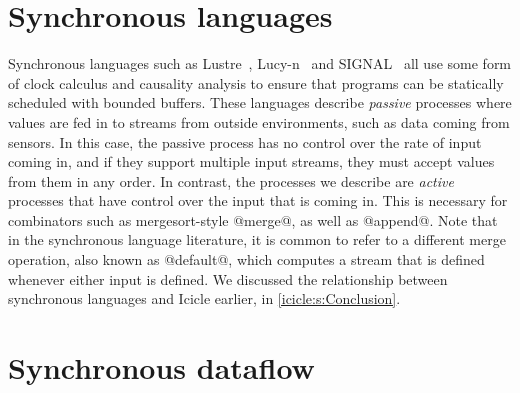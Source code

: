 \section{Synchronous languages}
\label{related/synchronous-languages}

Synchronous languages such as {\sc Lustre}~\cite{halbwachs1991synchronous}, Lucy-n~\cite{mandel2010lucy} and SIGNAL~\cite{le2003polychrony} all use some form of clock calculus and causality analysis to ensure that programs can be statically scheduled with bounded buffers.
These languages describe \emph{passive} processes where values are fed in to streams from outside environments, such as data coming from sensors.
In this case, the passive process has no control over the rate of input coming in, and if they support multiple input streams, they must accept values from them in any order.
In contrast, the processes we describe are \emph{active} processes that have control over the input that is coming in.
This is necessary for combinators such as mergesort-style @merge@, as well as @append@.
Note that in the synchronous language literature, it is common to refer to a different merge operation, also known as @default@, which computes a stream that is defined whenever either input is defined.
We discussed the relationship between synchronous languages and Icicle earlier, in \cref{icicle:s:Conclusion}.

\section{Synchronous dataflow}
\label{related/synchronous-dataflow}


